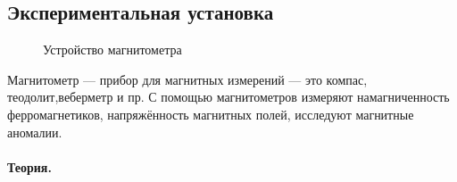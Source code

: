 \documentclass[a4paper, 12pt]{article}
\begin{document}
	\subsection*{Экспериментальная установка}
	\begin{figure}[h]
		\begin{minipage}[h]{0.5\linewidth}
		\end{minipage}
		\begin{minipage}[h]{0.5\linewidth}
		\end{minipage}
		\caption{Устройство магнитометра}
		\label{ris:station}
	\end{figure}
	Магнитометр — прибор для магнитных измерений — это компас, теодолит,веберметр и пр. С помощью магнитометров измеряют намагниченность ферромагнетиков, напряжённость магнитных полей, исследуют магнитные аномалии.\\
	
	\paragraph{Теория. } 
	
\end{document}
